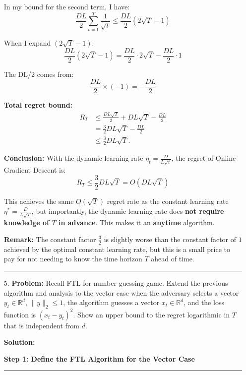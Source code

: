 \documentclass[12pt,letterpaper]{article}
\newenvironment{proof}{\noindent{\bf Proof:}}{\qed\bigskip}
\newcommand{\qed}{\rule{7pt}{7pt}}
\begin{document}
\begin{enumerate}
\begin{proof}
In my bound for the second term, I have:
$$\frac{DL}{2}\sum_{t=1}^{T}\frac{1}{\sqrt{t}} \leq \frac{DL}{2}(2\sqrt{T} - 1)$$

When I expand $(2\sqrt{T} - 1)$:
$$\frac{DL}{2}(2\sqrt{T} - 1) = \frac{DL}{2} \cdot 2\sqrt{T} - \frac{DL}{2} \cdot 1$$

The DL/2 comes from:
$$\frac{DL}{2} \times (-1) = -\frac{DL}{2}$$

\textbf{Total regret bound:}
\begin{align*}
R_T &\leq \frac{DL\sqrt{T}}{2} + DL\sqrt{T} - \frac{DL}{2} \\
&= \frac{3}{2}DL\sqrt{T} - \frac{DL}{2} \\
&\leq \frac{3}{2}DL\sqrt{T}.
\end{align*}

\bigskip

\textbf{Conclusion:} With the dynamic learning rate $\eta_t = \frac{D}{L\sqrt{t}}$, the regret of Online Gradient Descent is:
\[
\boxed{R_T \leq \frac{3}{2}DL\sqrt{T} = O(DL\sqrt{T})}
\]

This achieves the same $O(\sqrt{T})$ regret rate as the constant learning rate $\eta^* = \frac{D}{L\sqrt{T}}$, but importantly, the dynamic learning rate does \textbf{not require knowledge of $T$ in advance}. This makes it an \textbf{anytime} algorithm.

\bigskip

\textbf{Remark:} The constant factor $\frac{3}{2}$ is slightly worse than the constant factor of $1$ achieved by the optimal constant learning rate, but this is a small price to pay for not needing to know the time horizon $T$ ahead of time.

\end{proof}

        \item[5.]
\textbf{Problem:} Recall FTL for number-guessing game. Extend the previous algorithm and analysis to the vector case when the adversary selects a vector $y_t \in \mathbb{R}^d$, $\|y\|_2 \leq 1$, the algorithm guesses a vector $x_t \in \mathbb{R}^d$, and the loss function is $(x_t - y_t)^2$. Show an upper bound to the regret logarithmic in $T$ that is independent from $d$.

\bigskip

\textbf{Solution:}

\begin{proof}

\textbf{Step 1: Define the FTL Algorithm for the Vector Case}


\end{proof}
\end{enumerate}
\end{document}
